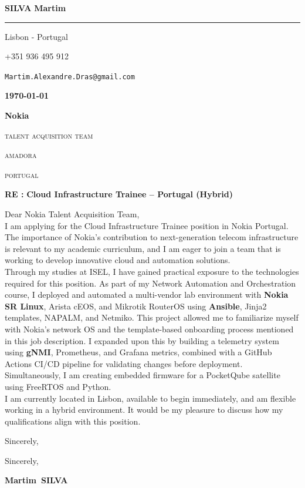 \documentclass[12pt]{article}
\newcommand{\firstname}{Martim}
\newcommand{\lastname}{Silva}
\newcommand{\mainColor}{nokiaBlue}
\newlength{\spacebox}
\newcommand{\shspace}{\hspace*{0.8em}}
\newcommand{\xvspace}{\vspace*{0.1em}}
\newcommand{\svspace}{\vspace*{0.5em}}
\newcommand{\mvspace}{\vspace*{1.5em}}
\newcommand{\hvspace}{\vspace*{2.5em}}
\newcommand{\negmvspace}{\vspace*{-1em}}
\newcommand{\userInfo}[4]{
    \begin{flushleft}
        \color{\mainColor}
        \Huge
        \textbf{\MakeUppercase{\lastname}}
        \color{black}
        \textbf{\firstname}
        \color{\mainColor}
        \noindent\rule{19.1cm}{0.8pt}
        \color{grayShy}
        \small
        \par
        \parbox{7\spacebox} {
            \faMap \shspace #1 - #2 \par \svspace
            \faPhone \shspace #3 \par \svspace
            \faEnvelopeOpen \shspace \texttt{#4} \par \svspace
        }
        \color{\mainColor}
        \mvspace
    \end{flushleft}
    \negmvspace
}
\newcommand{\companyInfo}[4]{
    \begin{flushright}
        \parbox{4\spacebox}{
            \raggedleft
            \small
            \textbf{\today}\par
            \xvspace
            \textbf{#1}\par
            \mvspace
            \color{grayShy} \textsc{\MakeLowercase{#2}}\par
            \xvspace
            \textsc{\MakeLowercase{#3}}\par
            \xvspace
            \textsc{\MakeLowercase{#4}}\par
            \color{black}
        }
    \end{flushright}
    \hvspace
}
\newcommand{\object}[1]{
    \small
    \color{\mainColor} \textbf{RE :} \color{black} \textbf{#1} \par
}
\newcommand{\content}[2]{
    \mvspace
    \begin{flushleft}
        \parbox{10.3\spacebox}{
          #1\par
          \svspace
          #2
        }\par
    \end{flushleft}
}
\newcommand{\signature}{
    \svspace
    \parbox{3\spacebox}{
      Sincerely,\par
      \svspace \hspace{-0.3em}
      \textbf{\color{\mainColor} \firstname\ \MakeUppercase{\lastname}}\par
      \svspace \svspace
      \Huge \faPenNib\par
    }\par
}
\begin{document}
\selectfont
\userInfo{Lisbon}{Portugal}{+351 936 495 912}{Martim.Alexandre.Dras@gmail.com}
\companyInfo{Nokia}{Talent Acquisition Team}{Amadora}{Portugal}
\object{Cloud Infrastructure Trainee -- Portugal (Hybrid)}
\content{
  Dear Nokia Talent Acquisition Team, \\

  I am applying for the Cloud Infrastructure Trainee position in Nokia Portugal. The importance
  of Nokia's contribution to next-generation telecom infrastructure is relevant to my academic
  curriculum, and I am eager to join a team that is working to develop innovative cloud and
  automation solutions. \\

  Through my studies at ISEL, I have gained practical exposure to the technologies required
  for this position. As part of my Network Automation and Orchestration course, I deployed
  and automated a multi-vendor lab environment with \textbf{Nokia SR Linux}, Arista cEOS,
  and Mikrotik RouterOS using \textbf{Ansible}, Jinja2 templates, NAPALM, and Netmiko.
  This project allowed me to familiarize myself with Nokia's network OS and the
  template-based onboarding process mentioned in this job description. I expanded upon this
  by building a telemetry system using \textbf{gNMI}, Prometheus, and Grafana metrics,
  combined with a GitHub Actions CI/CD pipeline for validating changes before deployment.
  Simultaneously, I am creating embedded firmware for a PocketQube satellite using FreeRTOS
  and Python. \\

  I am currently located in Lisbon, available to begin immediately, and am flexible working
  in a hybrid environment. It would be my pleasure to discuss how my qualifications align
  with this position. \\
}{Sincerely,}
\signature
\end{document}
